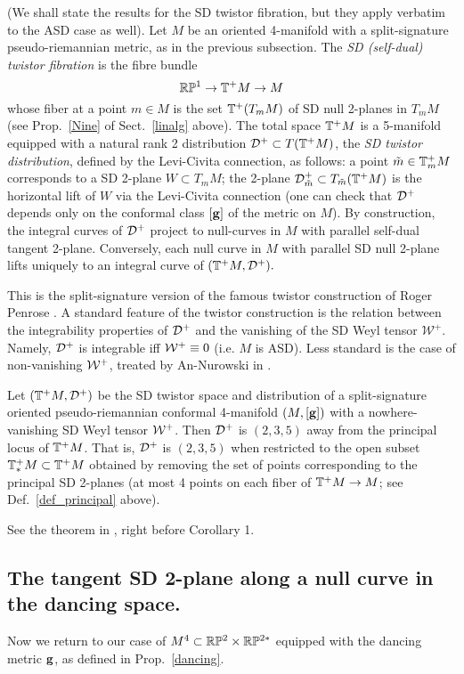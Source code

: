 (We shall state the  results for the SD twistor fibration, but they apply verbatim  to the ASD case as well). 
Let $M$ be an oriented 4-manifold with a split-signature pseudo-riemannian metric, as in the previous subsection. The  {\em SD (self-dual) twistor fibration} is the fibre bundle  $$\mathbb{R}\mathbb{P}^1\to\mathbb{T}^+M\to M$$  
 whose fiber at a point $m\in M$ is the set  $\mathbb{T}^+(T_mM)$ of  SD null 2-planes in $T_m M$ (see Prop.~\ref{Nine} of Sect.~\ref{linalg} above). 
 The total space $\mathbb{T}^+M$  is a 5-manifold  equipped with a natural rank 2 distribution ${\mathcal D}^+\subset T(\mathbb{T}^+M)$, the {\em SD twistor distribution},  defined by the Levi-Civita connection, as follows: a point $\tilde m\in\mathbb{T}^+_mM$  corresponds to a SD 2-plane $W\subset T_mM$; the 2-plane ${\mathcal D}^+_{\tilde m}\subset T_{\tilde m}(\mathbb{T} ^+M)$ is the horizontal lift of $W$  via  the Levi-Civita connection (one can check that ${\mathcal D}^+$ depends only on the conformal class $[\mathbf{ g}]$  of the metric on $M$). By construction, the integral curves of ${\mathcal D}^+$ project to null-curves in $M$ with parallel self-dual tangent  2-plane. Conversely, each null curve in $M$ with parallel SD null 2-plane lifts uniquely to an integral curve of $(\mathbb{T}^+M, {\mathcal D}^+).$
 
   This  is the split-signature version  of the famous twistor construction of Roger Penrose \cite{Pen}.
A  standard feature  of  the twistor construction is  the relation between the integrability properties of ${\mathcal D}^+$ and  the vanishing of the SD Weyl  tensor $\mathcal W^+$. Namely,   ${\mathcal D}^+$ is integrable iff $\mathcal W^+\equiv 0$ (i.e. $M$ is ASD). Less standard is the case of non-vanishing $\mathcal W^+$, treated by An-Nurowski in \cite{AN}. 


 \begin{theorem}[\cite{AN}]
 Let $(\mathbb{T}^+M,{\mathcal D}^+)$ be the SD twistor space and distribution of a split-signature oriented pseudo-riemannian conformal 4-manifold $(M,[\mathbf{ g}])$ with a nowhere-vanishing SD Weyl tensor $\mathcal W^+$. Then ${\mathcal D}^+$ is  $(2,3,5)$  away from the principal locus of  $\mathbb{T}^+M$. That is,  ${\mathcal D}^+$ is  $(2,3,5)$ when restricted to the open subset  $\mathbb{T}^+_*M\subset \mathbb{T}^+M$ obtained by removing the set of points corresponding to the principal SD 2-planes (at most 4 points on each fiber of $\mathbb{T}^+M\to M$; see Def.~\ref{def_principal} above).
 \end{theorem} 
See the theorem   in \cite{AN}, right before Corollary 1. 

 

\subsection{The tangent SD 2-plane along a null curve in the dancing space.}\label{tang_SD}
Now we return to our case of $M^4\subset \mathbb{R}\mathbb{P}^2\times \mathbb{R}\mathbb{P}^{2*}$ equipped with the dancing metric $\mathbf{ g}$, as defined in Prop.~\ref{dancing}.

